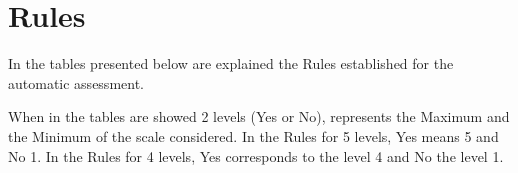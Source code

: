 \chapter{Rules} \label{ap1:loren}

In the tables presented below are explained the Rules established for the automatic assessment.

When in the tables are showed 2 levels (Yes or No), represents the Maximum and the Minimum of the scale considered. In the Rules for 5 levels, Yes means 5 and No 1. In the Rules for 4 levels, Yes corresponds to the level 4 and No the level 1.



